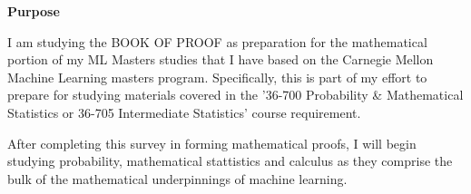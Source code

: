 \documentclass[../main.tex]{subfiles}
\begin{document}
\textbf{Purpose}

I am studying the BOOK OF PROOF as preparation for the mathematical portion of
my ML Masters studies that I have based on the Carnegie Mellon Machine Learning
masters program. Specifically, this is part of my effort to prepare for
studying materials covered in the '36-700 Probability & Mathematical Statistics
or 36-705 Intermediate Statistics' course requirement.

After completing this survey in forming mathematical proofs, I will begin
studying probability, mathematical stattistics and calculus as they comprise
the bulk of the mathematical underpinnings of machine learning.
\end{document}
